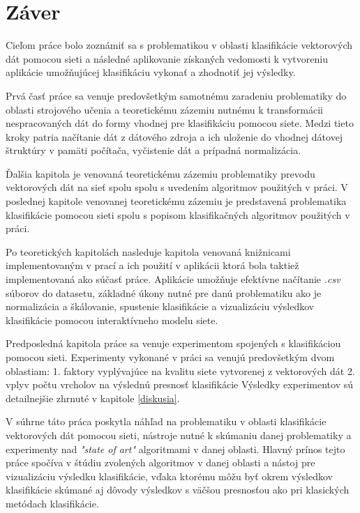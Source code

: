 \documentclass[slovak,master,dept460,male,cpp,cpdeclaration]{diploma}
\begin{document}
\section{Záver}
Cieľom práce bolo zoznámiť sa s problematikou v oblasti klasifikácie vektorových dát pomocou sieti a následné aplikovanie získaných vedomosti k vytvoreniu aplikácie umožňujúcej klasifikáciu vykonať a zhodnotiť jej výsledky.

Prvá časť práce sa venuje predovšetkým samotnému zaradeniu problematiky do oblasti strojového učenia a teoretickému zázemiu nutnému k transformácii nespracovaných dát do formy vhodnej pre klasifikáciu pomocou siete. Medzi tieto kroky patria načítanie dát z dátového zdroja a ich uloženie do vhodnej dátovej štruktúry v pamäti počítača, vyčistenie dát a prípadná normalizácia.

Ďalšia kapitola je venovaná teoretickému zázemiu problematiky prevodu vektorových dát na sieť spolu spolu s uvedením algoritmov použitých v práci. 
V poslednej kapitole venovanej teoretickému zázemiu je predstavená problematika klasifikácie pomocou sieti spolu s popisom klasifikačných algoritmov použitých v práci.

Po teoretických kapitolách nasleduje kapitola venovaná knižnicami implementovaným v prací a ich použití v aplikácii ktorá bola taktiež implementovaná ako súčasť práce. Aplikácie umožňuje efektívne načítanie \textit{.csv} súborov do datasetu, základné úkony nutné pre danú problematiku ako je normalizácia a škálovanie, spustenie klasifikácie a vizualizáciu výsledkov klasifikácie pomocou interaktívneho modelu siete. 

Predposledná kapitola práce sa venuje experimentom spojených s klasifikáciou pomocou sieti. Experimenty vykonané v práci sa venujú predovšetkým  dvom oblastiam:
1. faktory vyplývajúce na kvalitu siete vytvorenej z vektorových dát
2. vplyv počtu vrcholov na výslednú presnosť klasifikácie 
Výsledky experimentov sú detailnejšie zhrnuté v kapitole \ref{diskusia}.

V súhrne táto práca poskytla náhľad na problematiku v oblasti klasifikácie vektorových dát pomocou sieti, nástroje nutné k skúmaniu danej problematiky a experimenty nad \textit{"state of art"} algoritmami v danej oblasti.  Hlavný prínos tejto práce spočíva v štúdiu zvolených algoritmov v danej oblasti a nástoj pre vizualizáciu výsledku klasifikácie, vďaka ktorému môžu byť okrem výsledkov klasifikácie skúmané aj dôvody výsledkov s väčšou presnosťou ako pri klasických metódach klasifikácie.
\end{document}
